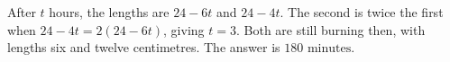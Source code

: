 After $t$ hours, the lengths are $24-6t$ and $24-4t$. The second is twice the first when $24-4t=2(24-6t)$, giving $t=3$. Both are still burning then, with lengths six and twelve centimetres. The answer is $\boxed{180\text{ minutes}}$.
